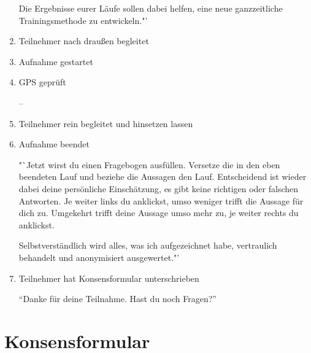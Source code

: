 \begin{enumerate}
	Die Ergebnisse eurer Läufe sollen dabei helfen, eine neue ganzzeitliche Trainingsmethode zu entwickeln."'
	
	\item Teilnehmer nach draußen begleitet 
	\item Aufnahme gestartet 
	\item GPS geprüft
	
	--
	
	\item Teilnehmer rein begleitet und hinsetzen lassen 
	\item Aufnahme beendet
	
	"`Jetzt wirst du einen Fragebogen ausfüllen. Versetze die in den eben beendeten Lauf und beziehe die Aussagen den Lauf. Entscheidend ist wieder dabei deine persönliche Einschätzung, es gibt keine richtigen oder falschen Antworten. Je weiter links du anklickst, umso weniger trifft die Aussage für dich zu. Umgekehrt trifft deine Aussage umso mehr zu, je weiter rechts du anklickst.
	
	Selbstverständlich wird alles, was ich aufgezeichnet habe, vertraulich behandelt und anonymisiert ausgewertet."'
	
	\item Teilnehmer hat Konsensformular unterschrieben
	
	"`Danke für deine Teilnahme. Hast du noch Fragen?"' 
\end{enumerate}
\newpage

\section{Konsensformular} 

\label{sec:konsensformular}

